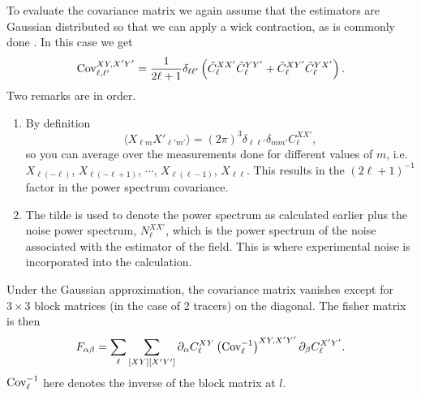 \documentclass[11pt]{article} %
\DeclareRobustCommand{\Cov}{\ifmmode\text{Cov}\else d\fi}
\newcommand{\br}[1]{\ensuremath{\left( #1 \right)}}
\begin{document}
To evaluate the covariance matrix we again assume that the estimators are Gaussian distributed so that we can apply a wick contraction, as is commonly done \cite{tegmark1997cosmic}. In this case we get
\begin{equation*}
    \Cov^{XY, X'Y'}_{\ell, \ell'} = \frac{1}{2\ell+1}\delta_{\ell \ell'}\br{\tilde C^{XX'}_\ell \tilde C^{YY'}_\ell + \tilde C^{XY'}_\ell \tilde C^{YX'}_\ell}.
\end{equation*}
Two remarks are in order.
\begin{enumerate}
    \item By definition
    \begin{equation*}
        \langle X_{\ell m}X'_{\ell'm'} \rangle = (2\pi)^3 \delta_{\ell\ell'}\delta_{mm'}C_\ell^{XX'},
    \end{equation*}
    so you can average over the measurements done for different values of $m$, i.e. $X_{\ell(-\ell)}$, $X_{\ell(-\ell+1)}$, $\cdots$, $X_{\ell(\ell-1)}$, $X_{\ell \ell}$. This results in the $(2\ell+1)^{-1}$ factor in the power spectrum covariance. 
    \item The tilde is used to denote the power spectrum as calculated earlier plus the noise power spectrum, $N^{XX'}_\ell$, which is the power spectrum of the noise associated with the estimator of the field. This is where experimental noise is incorporated into the calculation. 
\end{enumerate}
Under the Gaussian approximation, the covariance matrix vanishes except for $3\times 3$ block matrices (in the case of 2 tracers) on the diagonal. The fisher matrix is then
\begin{equation*}
    F_{\alpha\beta} = \sum_{\ell}\sum_{[XY][X'Y']} \partial_\alpha C_{\ell}^{XY} \br{\Cov^{-1}_\ell}^{XY, X'Y'} \partial_\beta C^{X'Y'}_{\ell}.
\end{equation*} 
$\Cov^{-1}_\ell$ here denotes the inverse of the block matrix at $l$.
\end{document}
